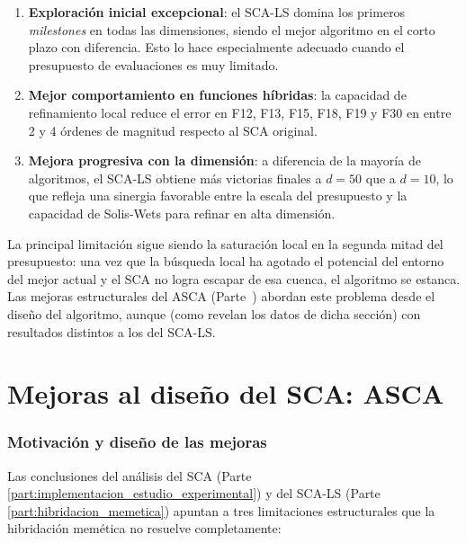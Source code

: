 \documentclass[12pt,a4paper]{article}
\begin{document}
\begin{enumerate}
  \item \textbf{Exploración inicial excepcional}: el SCA-LS domina los primeros \textit{milestones} en todas las dimensiones, siendo el mejor algoritmo en el corto plazo con diferencia. Esto lo hace especialmente adecuado cuando el presupuesto de evaluaciones es muy limitado.
  \item \textbf{Mejor comportamiento en funciones híbridas}: la capacidad de refinamiento local reduce el error en F12, F13, F15, F18, F19 y F30 en entre 2 y 4 órdenes de magnitud respecto al SCA original.
  \item \textbf{Mejora progresiva con la dimensión}: a diferencia de la mayoría de algoritmos, el SCA-LS obtiene más victorias finales a $d=50$ que a $d=10$, lo que refleja una sinergia favorable entre la escala del presupuesto y la capacidad de Solis-Wets para refinar en alta dimensión.
\end{enumerate}
 
La principal limitación sigue siendo la saturación local en la segunda mitad del presupuesto: una vez que la búsqueda local ha agotado el potencial del entorno del mejor actual y el SCA no logra escapar de esa cuenca, el algoritmo se estanca. Las mejoras estructurales del ASCA (Parte~\ref{part:asca}) abordan este problema desde el diseño del algoritmo, aunque (como revelan los datos de dicha sección) con resultados distintos a los del SCA-LS.
 
\clearpage
\part{Mejoras al diseño del SCA: ASCA}\label{part:asca}
 
\section{Motivación y diseño de las mejoras}
\label{sec:asca}
 
Las conclusiones del análisis del SCA (Parte \ref{part:implementacion_estudio_experimental}) y del SCA-LS (Parte \ref{part:hibridacion_memetica}) apuntan a tres limitaciones estructurales que la hibridación memética no resuelve completamente:
 
\end{document}
